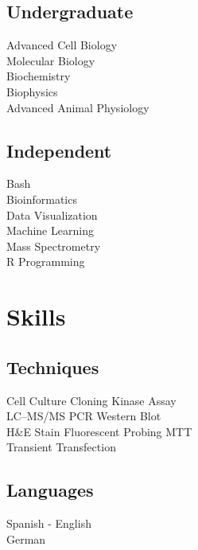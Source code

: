 \documentclass[]{deedy-resume-openfont}
\begin{document}
\begin{minipage}[t]{0.33\textwidth}
\subsection{Undergraduate}
Advanced Cell Biology \\
Molecular Biology \\
Biochemistry \\
Biophysics \\
Advanced Animal Physiology \\
\sectionsep

\subsection{Independent}
Bash\\
Bioinformatics\\
Data Visualization\\
Machine Learning\\
Mass Spectrometry\\
R Programming\\
\sectionsep


\section{Skills}
\subsection{Techniques}
Cell Culture \textbullet{}  Cloning \textbullet{} Kinase Assay\\
LC--MS/MS \textbullet{} PCR \textbullet{} Western Blot \\
H\&E Stain \textbullet{} Fluorescent Probing \textbullet{} MTT \\
Transient Transfection \textbullet{} 
\sectionsep

\subsection{Languages}
Spanish - English \\
German



\end{minipage}
\end{document}
